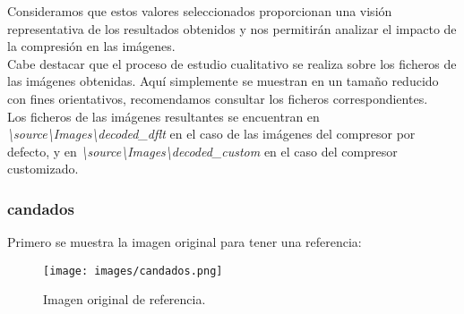 \documentclass[12pt,a4paper]{article}
\begin{document}
Consideramos que estos valores seleccionados proporcionan una visión representativa de los resultados obtenidos y nos permitirán analizar el impacto de la compresión en las imágenes.\\

Cabe destacar que el proceso de estudio cualitativo se realiza sobre los ficheros de las imágenes obtenidas. Aquí simplemente se muestran en un tamaño reducido con fines orientativos, recomendamos consultar los ficheros correspondientes.\\

Los ficheros de las imágenes resultantes se encuentran en \textit{\textbackslash source\textbackslash Images\textbackslash decoded\_dflt} en el caso de las imágenes del compresor por defecto, y en \textit{\textbackslash source\textbackslash Images\textbackslash decoded\_custom} en el caso del compresor customizado.

\subsubsection{candados}
Primero se muestra la imagen original para tener una referencia:
\begin{figure}[H]
    \centering
    \texttt{[image: images/candados.png]}
    \caption[Referencia - candados]{Imagen original de referencia.}
    \label{fig:top_candados}
\end{figure}
    \vspace{0.5cm}
\end{document}
